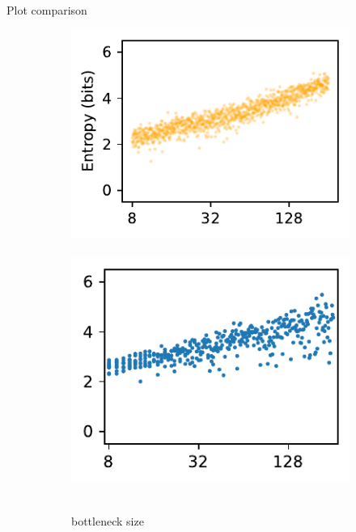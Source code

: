 \documentclass{beamer}
\begin{document}
\begin{frame}{Plot comparison}
\begin{center}
\begin{figure}
            \begin{subfigure}[t]{\subfigwidth\linewidth}
                \centering
                \includegraphics[height=\plotheight]{assets/model-n_params.pdf}
                \hbox{
                    \hspace{-0.0em}
                    \includegraphics[height=\plotheight]{assets/bottleneck_size_log-entropy-default.pdf}
                }
                \caption{\scriptsize bottleneck size}
            \end{subfigure}
            \begin{subfigure}[t]{\subfigwidth\linewidth}

\end{subfigure}
\end{figure}
\end{center}
\end{frame}
\end{document}
